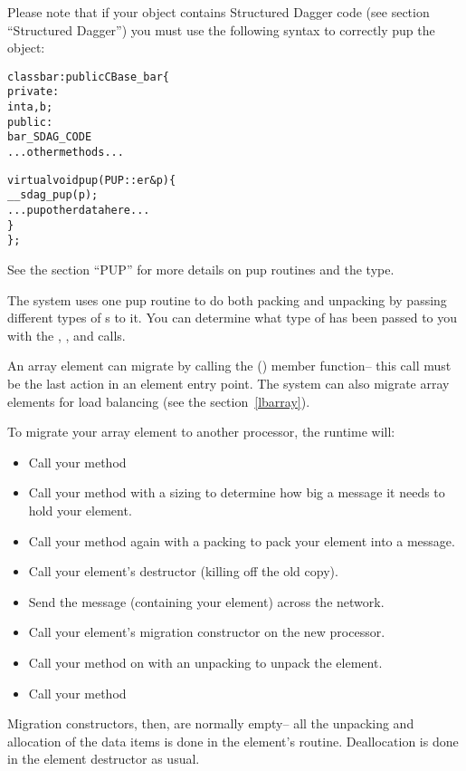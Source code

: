 Please note that if your object contains Structured Dagger code (see section ``Structured Dagger'') you must use the following syntax to correctly pup the object:

\begin{alltt}
class bar: public CBase\_bar \{
 private:
    int a,b;
 public:
    bar_SDAG_CODE 
    ...other methods...

    virtual void pup(PUP::er& p) \{
      __sdag_pup(p);
      ...pup other data here...
    \}
\};
\end{alltt}

See the  section ``PUP'' for more details on pup routines
and the  type.

The system uses one pup routine to do both packing and unpacking by
passing different types of s to it.  You can determine
what type of  has been passed to you with the
, , and  calls.

An array element can migrate by calling the () member function-- this call must be the last action
in an element entry point.  The system can also migrate array elements
for load balancing (see the section~\ref{lbarray}).

To migrate your array element to another processor, the \charmpp{}
runtime will:

\begin{itemize}
\item Call your  method
\item Call your  method with a sizing  to determine how 
big a message it needs to hold your element.
\item Call your  method again with a packing  to pack 
your element into a message.
\item Call your element's destructor (killing off the old copy).
\item Send the message (containing your element) across the network.
\item Call your element's migration constructor on the new processor.
\item Call your  method on with an unpacking  to unpack 
the element.
\item Call your  method
\end{itemize}

Migration constructors, then, are normally empty-- all the unpacking
and allocation of the data items is done in the element's  routine.
Deallocation is done in the element destructor as usual.


